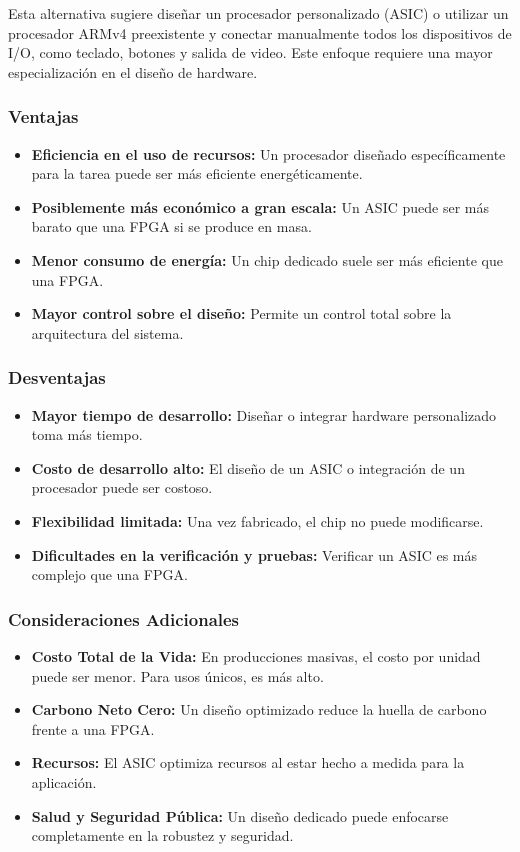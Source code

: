 \documentclass[conference]{IEEEtran}
\begin{document}
Esta alternativa sugiere diseñar un procesador personalizado (ASIC) o utilizar un procesador ARMv4 preexistente y conectar manualmente todos los dispositivos de I/O, como teclado, botones y salida de video. Este enfoque requiere una mayor especialización en el diseño de hardware.

\subsubsection*{Ventajas}

\begin{itemize}
	\item \textbf{Eficiencia en el uso de recursos:} Un procesador diseñado específicamente para la tarea puede ser más eficiente energéticamente.
	\item \textbf{Posiblemente más económico a gran escala:} Un ASIC puede ser más barato que una FPGA si se produce en masa.
	\item \textbf{Menor consumo de energía:} Un chip dedicado suele ser más eficiente que una FPGA.
	\item \textbf{Mayor control sobre el diseño:} Permite un control total sobre la arquitectura del sistema.
\end{itemize}

\subsubsection*{Desventajas}

\begin{itemize}
	\item \textbf{Mayor tiempo de desarrollo:} Diseñar o integrar hardware personalizado toma más tiempo.
	\item \textbf{Costo de desarrollo alto:} El diseño de un ASIC o integración de un procesador puede ser costoso.
	\item \textbf{Flexibilidad limitada:} Una vez fabricado, el chip no puede modificarse.
	\item \textbf{Dificultades en la verificación y pruebas:} Verificar un ASIC es más complejo que una FPGA.
\end{itemize}

\subsubsection*{Consideraciones Adicionales}

\begin{itemize}
	\item \textbf{Costo Total de la Vida:} En producciones masivas, el costo por unidad puede ser menor. Para usos únicos, es más alto.
	\item \textbf{Carbono Neto Cero:} Un diseño optimizado reduce la huella de carbono frente a una FPGA.
	\item \textbf{Recursos:} El ASIC optimiza recursos al estar hecho a medida para la aplicación.
	\item \textbf{Salud y Seguridad Pública:} Un diseño dedicado puede enfocarse completamente en la robustez y seguridad.
\end{itemize}
\end{document}
